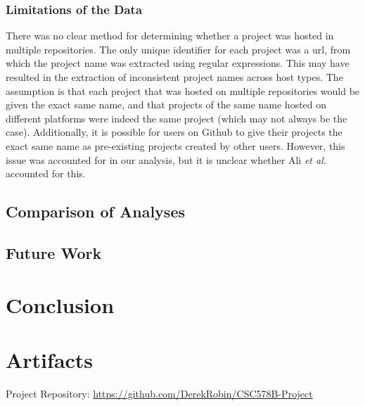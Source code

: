 \documentclass[acmconf]{acmart}
\begin{document}
\subsubsection{Limitations of the Data}

There was no clear method for determining whether a project was hosted in multiple repositories.
The only unique identifier for each project was a url, from which the project name was extracted using regular expressions.
This may have resulted in the extraction of inconsistent project names across host types.
The assumption is that each project that was hosted on multiple repositories would be given the exact same name, and that projects of the same name hosted on different platforms were indeed the same project (which may not always be the case).
Additionally, it is possible for users on Github to give their projects the exact same name as pre-existing projects created by other users.
However, this issue was accounted for in our analysis, but it is unclear whether Ali \emph{et al.} accounted for this.

\subsection{Comparison of Analyses}

\subsection{Future Work}

\section{Conclusion}




\appendix

\section{Artifacts}
Project Repository: \url{https://github.com/DerekRobin/CSC578B-Project}
\end{document}
